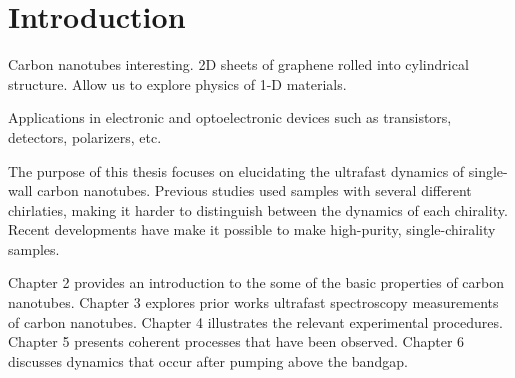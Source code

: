 \chapter{Introduction}

Carbon nanotubes interesting. 2D sheets of graphene rolled into cylindrical structure. Allow us to explore physics of 1-D materials. 


Applications in electronic and optoelectronic devices such as transistors, detectors, polarizers, etc. 

The purpose of this thesis focuses on elucidating the ultrafast dynamics of single-wall carbon nanotubes. Previous studies used samples with several different chirlaties, making it harder to distinguish between the dynamics of each chirality. Recent developments have make it possible to make high-purity, single-chirality samples. 

Chapter 2 provides an introduction to the some of the basic properties of carbon nanotubes. Chapter 3 explores prior works ultrafast spectroscopy measurements of carbon nanotubes. Chapter 4 illustrates the relevant experimental procedures. Chapter 5 presents coherent processes that have been observed. Chapter 6 discusses dynamics that occur after pumping above the bandgap.